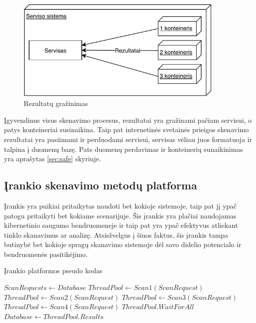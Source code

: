 \documentclass[a4paper,12pt,fleqn]{article}
\begin{document}
\begin{figure}[H]
	\centering
	\includegraphics[width=0.9\textwidth]{figs/3Containerlt.pdf}
	\caption{Rezultatų gražinimas}
	\label{fig:3Container}
\end{figure}

Įgyvendinus visus skenavimo procesus, rezultatai yra gražinami pačiam servisui, o patys konteineriai susinaikina. Taip pat internetinės svetainės prieigos skenavimo rezultatai yra pasiimami ir perduodami servisui, servisas vėliau juos formatuoja ir talpina į duomenų bazę. Pats duomenų perdavimas ir konteinerių sunaikinimas yra aprašytas \ref{sec:safe} skyriuje.


\subsection{Įrankio skenavimo metodų platforma}

Įrankis yra puikiai pritaikytas naudoti bet kokioje sistemoje, taip pat jį ypač patogu pritaikyti bet kokiame scenarijuje. Šis įrankis yra plačiai naudojamas kibernetinio saugumo bendruomeneje ir taip pat yra ypač efektyvus atliekant tinklo skanavimus ar analizę. Atsisžvelgus į šiuos faktus, šis įrankis tampa butinybė bet kokioje spragų skanavimo sistemoje dėl savo didelio potencialo ir bendruomenės pasitikėjimo.
\begin{algorithm}
	\caption{Įrankio platformos pseudo kodas}
	\label{alg:pseudo}
	\begin{algorithmic}
		\STATE $ScanRequests \gets Database$
		\STATE $ThreadPool \gets Scan1(ScanRequest)$
		\STATE $ThreadPool \gets Scan2(ScanRequest)$
		\STATE $ThreadPool \gets Scan3(ScanRequest)$
		\STATE $ThreadPool \gets Scan4(ScanRequest)$
		\STATE $ThreadPool. Wait For All$
		\ENDFOR
		\STATE $Database \gets ThreadPool.Results$
		\ENDIF
	\end{algorithmic}
\end{algorithm}
\end{document}
